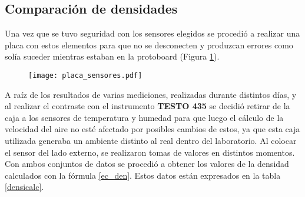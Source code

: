 \subsection{Comparación de densidades} \label{cap:densidades}

Una vez que se tuvo seguridad con los sensores elegidos se procedió a realizar una placa con estos elementos para que no se desconecten y produzcan errores como solía suceder mientras estaban en la protoboard (Figura \ref{fig:sensoresa}). \\
\begin{figure}[H]
	\centering
	\texttt{[image: placa\_sensores.pdf]}
	\label{fig:sensoresa}
\end{figure}

A raíz de los resultados de varias mediciones, realizadas durante distintos días, y al realizar el contraste con el instrumento \textbf{TESTO 435} se decidió retirar de la caja a los sensores de temperatura y humedad para que luego el cálculo de la velocidad del aire no esté afectado por posibles cambios de estos, ya que esta caja utilizada generaba un ambiente distinto al real dentro del laboratorio. Al colocar el sensor del lado externo, se realizaron tomas de valores en distintos momentos. Con ambos conjuntos de datos se procedió a obtener los valores de la densidad calculados con la fórmula \ref{ec_den}. Estos datos están expresados en la tabla \ref{densicalc}. 


